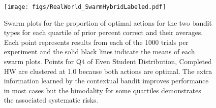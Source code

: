 










\begin{figure}[t]
    \centering
    \texttt{[image: figs/RealWorld\_SwarmHybridLabeled.pdf]}
    \caption{Swarm plots for the proportion of optimal actions for the two bandit types for each quartile of prior percent correct and their averages. Each point represents results from each of the 1000 trials per experiment and the solid black lines indicate the means of each swarm plots. Points for Q4 of Even Student Distribution, Completed HW are clustered at 1.0 because both actions are optimal. The extra information learned by the contextual bandit improves performance in most cases but the bimodality for some quartiles demonstrates the associated systematic risks.}
    \label{fig:realworldDistribution}
\end{figure}

